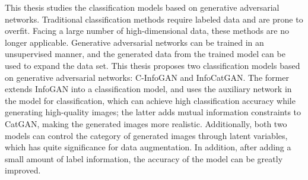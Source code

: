 This thesis studies the classification models based on generative adversarial networks. Traditional classification methods require labeled data and are prone to overfit. Facing a large number of high-dimensional data, these methods are no longer applicable. Generative adversarial networks can be trained in an unsupervised manner, and the generated data from the trained model can be used to expand the data set. This thesis proposes two classification models based on generative adversarial networks: C-InfoGAN and InfoCatGAN. The former extends InfoGAN into a classification model, and uses the auxiliary network in the model for classification, which can achieve high classification accuracy while generating high-quality images; the latter adds mutual information constraints to CatGAN, making the generated images more realistic. Additionally, both two models can control the category of generated images through latent variables, which has quite significance for data augmentation. In addition, after adding a small amount of label information, the accuracy of the model can be greatly improved.


